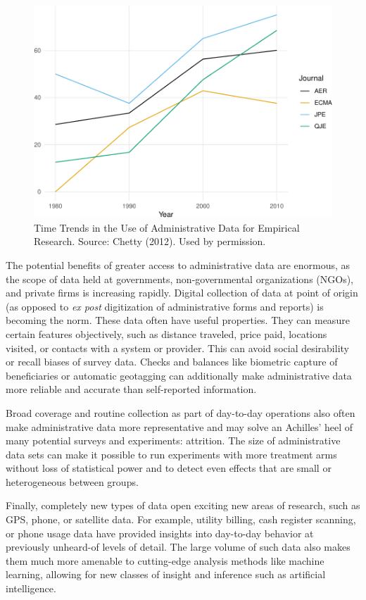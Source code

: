 \documentclass[
]{book}
\begin{document}
\begin{figure}
\centering
\includegraphics{figures/introchetty-1.pdf}
\caption{\label{fig:introchetty}Time Trends in the Use of Administrative Data for Empirical Research. Source: Chetty (2012). Used by permission.}
\end{figure}

The potential benefits of greater access to administrative data are enormous, as the scope of data held at governments, non-governmental organizations (NGOs), and private firms is increasing rapidly. Digital collection of data at point of origin (as opposed to \emph{ex post} digitization of administrative forms and reports) is becoming the norm. These data often have useful properties. They can measure certain features objectively, such as distance traveled, price paid, locations visited, or contacts with a system or provider. This can avoid social desirability or recall biases of survey data. Checks and balances like biometric capture of beneficiaries or automatic geotagging can additionally make administrative data more reliable and accurate than self-reported information.

Broad coverage and routine collection as part of day-to-day operations also often make administrative data more representative and may solve an Achilles' heel of many potential surveys and experiments: attrition. The size of administrative data sets can make it possible to run experiments with more treatment arms without loss of statistical power and to detect even effects that are small or heterogeneous between groups.

Finally, completely new types of data open exciting new areas of research, such as GPS, phone, or satellite data. For example, utility billing, cash register scanning, or phone usage data have provided insights into day-to-day behavior at previously unheard-of levels of detail. The large volume of such data also makes them much more amenable to cutting-edge analysis methods like machine learning, allowing for new classes of insight and inference such as artificial intelligence.
\end{document}
